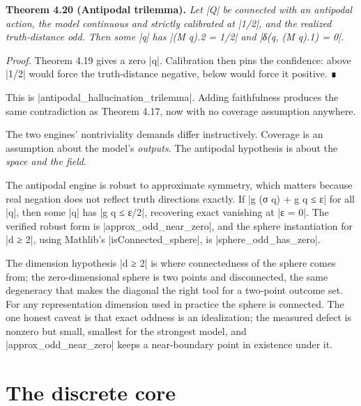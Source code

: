 \documentclass{memoir}
\begin{document}
\textbf{Theorem 4.20 (Antipodal trilemma).} \emph{Let \LeanVerb|Q| be connected with an antipodal action,
the model continuous and strictly calibrated at \LeanVerb|1/2|, and the realized
truth-distance odd. Then some \LeanVerb|q| has \LeanVerb|(M q).2 = 1/2| and \LeanVerb|δ(q, (M q).1) = 0|.}

\emph{Proof.} Theorem 4.19 gives a zero \LeanVerb|q|. Calibration then pins the confidence: above
\LeanVerb|1/2| would force the truth-distance negative, below would force it positive. ∎

This is \LeanVerb|antipodal_hallucination_trilemma|. Adding faithfulness produces the
same contradiction as Theorem 4.17, now with no coverage assumption anywhere.

The two engines' nontriviality demands differ instructively. Coverage is an
assumption about the model's \emph{outputs}. The antipodal hypothesis is about the
\emph{space and the field}.

The antipodal engine is robust to approximate symmetry, which matters because
real negation does not reflect truth directions exactly. If \LeanVerb|g (σ q) + g q ≤ ε|
for all \LeanVerb|q|, then some \LeanVerb|q| has \LeanVerb|g q ≤ ε/2|, recovering exact vanishing at \LeanVerb|ε = 0|.
The verified robust form is \LeanVerb|approx_odd_near_zero|, and the sphere instantiation
for \LeanVerb|d ≥ 2|, using Mathlib's \LeanVerb|isConnected_sphere|, is \LeanVerb|sphere_odd_has_zero|.

The dimension hypothesis \LeanVerb|d ≥ 2| is where connectedness of the sphere comes
from; the zero-dimensional sphere is two points and disconnected, the same
degeneracy that makes the diagonal the right tool for a two-point outcome set.
For any representation dimension used in practice the sphere is connected. The
one honest caveat is that exact oddness is an idealization; the measured defect
is nonzero but small, smallest for the strongest model, and
\LeanVerb|approx_odd_near_zero| keeps a near-boundary point in existence under it.



\section{The discrete core}\label{Two--Schemas--of--Impossibility-005F-005F-005F--Machine--Checked--Limits--of--Trustworthy--Machine--Learning-005F-005F-005F--and--Why--They--Tighten--with--Capability----From--Logic--to--Analysis----The--discrete--core}
\end{document}
